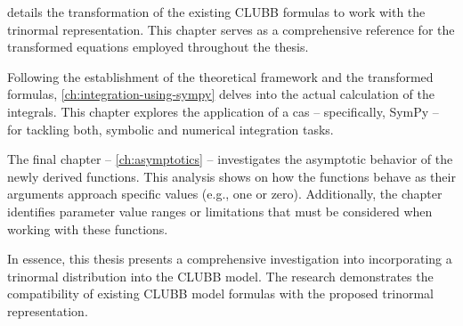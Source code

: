 details the transformation of the existing \gls{CLUBB} formulas to work with the trinormal representation.
This chapter serves as a comprehensive reference for the transformed equations employed throughout the thesis.

Following the establishment of the theoretical framework and the transformed formulas,
\cref{ch:integration-using-sympy} delves into the actual calculation of the integrals.
This chapter explores the application of a \gls{cas} -- specifically, SymPy --
for tackling both, symbolic and numerical integration tasks.

The final chapter -- \cref{ch:asymptotics} --
investigates the asymptotic behavior of the newly derived functions.
This analysis shows on how the functions behave as their arguments approach specific values (e.g., one or zero).
Additionally, the chapter identifies parameter value ranges or limitations
that must be considered when working with these functions.

In essence, this thesis presents a comprehensive investigation into incorporating a trinormal distribution into the \gls{CLUBB} model.
The research demonstrates the compatibility of existing \gls{CLUBB} model formulas with the proposed trinormal representation.

